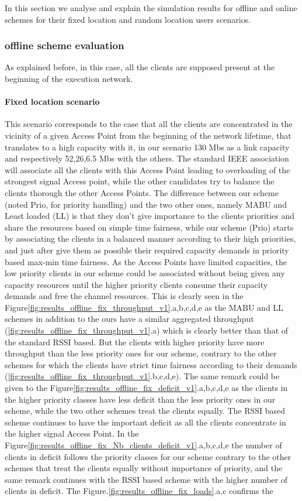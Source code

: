 \documentclass[journal,transmag]{IEEEtran}
\begin{document}
In this section we analyse and explain the simulation results for offline and online schemes for their fixed location and random location users scenarios.

\subsubsection{offline scheme evaluation}
As explained before, in this case, all the clients are supposed present at the beginning of the execution network.
\paragraph{Fixed location scenario} This scenario corresponds to the case that all the clients are concentrated in the vicinity of a given Access Point from the beginning of the network lifetime, that translates to a high capacity with it, in our scenario 130 Mbs as a link capacity and respectively 52,26,6.5 Mbs with the others. The standard IEEE association will associate all the clients with this Access Point leading to overloading of the strongest signal Access point, while the other candidates try to balance the clients thorough the other Access Points. The difference between our scheme (noted Prio, for priority handling) and the two other ones, namely MABU and Least loaded (LL) is that they don't give importance to the clients priorities and share the resources based on simple time fairness, while our scheme (Prio) starts by associating the clients in a balanced manner according to their high priorities, and just after give them as possible their required capacity demands in priority based max-min time fairness. As the Access Points have limited capacities, the low priority clients in our scheme could be associated without being given any capacity resources until the higher priority clients consume their capacity demands and free the channel resources. This is clearly seen in the Figure\ref{fig:results_offline_fix_throughput_v1}.a,b,c,d,e as the MABU and LL schemes in addition to the ours have a similar aggregated throughput (\ref{fig:results_offline_fix_throughput_v1}.a) which is clearly better than that of the standard RSSI based. But the clients with higher priority have more throughput than the less priority ones for our scheme, contrary to the other schemes for which the clients have strict time fairness according to their demands (\ref{fig:results_offline_fix_throughput_v1}.b,c,d,e). The same remark could be given to the Figure\ref{fig:results_offline_fix_deficit_v1}.a,b,c,d,e as the clients in the higher priority classes have less deficit than the less priority ones in our scheme, while the two other schemes treat the clients equally. The RSSI based scheme continues to have the important deficit as all the clients concentrate in the higher signal Access Point. In the Figure\ref{fig:results_offline_fix_Nb_clients_deficit_v1}.a,b,c,d,e the number of clients in deficit follows the priority classes for our scheme contrary to the other schemes that treat the clients equally without importance of priority, and the same remark continues with the RSSI based scheme with the higher number of clients in deficit. The Figure.\ref{fig:results_offline_fix_loads}.a,c confirms the 
\end{document}
